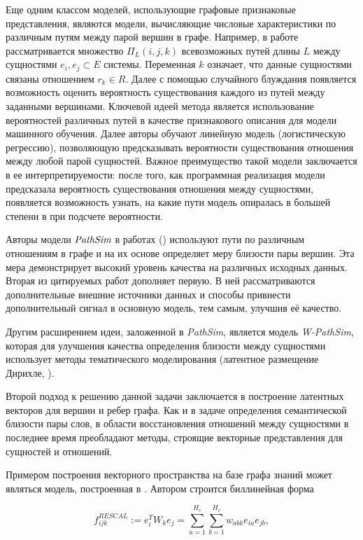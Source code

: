 Еще одним классом моделей, использующие графовые признаковые представления, являются модели, вычисляющие числовые характеристики по различным путям между парой вершин в графе. Например, в работе \cite{lao} рассматривается множество $\Pi_{L}(i, j, k)$ всевозможных путей длины $L$ между сущностями $e_i, e_j \subset E$ системы. Переменная $k$ означает, что данные сущностями связаны отношением $r_k \in R$. Далее с помощью случайного блуждания появляется возможность оценить вероятность существования каждого из путей между заданными вершинами. Ключевой идеей метода является использование вероятностей различных путей в качестве признакового описания для модели машинного обучения. Далее авторы обучают линейную модель (логистическую регрессию), позволяющую предсказывать вероятности существования отношения между любой парой сущностей. Важное преимущество такой модели заключается в ее интерпретируемости: после того, как программная реализация модели предсказала вероятность существования отношения между сущностями, появляется возможность узнать, на какие пути модель опиралась в большей степени в при подсчете вероятности.

Авторы модели $\emph{PathSim}$ в работах (\cite{pathsim, pathsimext}) используют пути по различным отношениям в графе и на их основе определяет меру близости пары вершин. Эта мера демонстрирует высокий уровень качества на различных исходных данных. Вторая из цитируемых работ дополняет первую. В ней рассматриваются дополнительные внешние источники данных и способы привнести дополнительный сигнал в основную модель, тем самым, улучшив её качество.

Другим расширением идеи, заложенной  в \emph{PathSim}, является модель \emph{W-PathSim}, которая для улучшения качества определения близости между сущностями использует методы тематического моделирования (латентное размещение Дирихле, \cite{lda}).

Второй подход к решению данной задачи заключается в построение латентных векторов для вершин и ребер графа. Как и в задаче определения семантической близости пары слов, в области  восстановления отношений между сущностями в последнее время преобладают методы, строящие векторные представления для сущностей и отношений. 

Примером построения векторного пространства на базе графа знаний может являться модель, построенная в \cite{phd_nickel13}. Автором строится биллинейная форма 

$$ f_{ijk}^{RESCAL} := e_i^TW_ke_j  = \sum_{a=1}^{H_e}\sum_{b=1}^{H_e}w_{abk}e_{ia}e_{jb},$$ 

